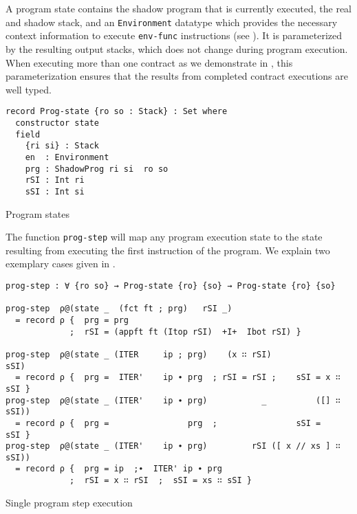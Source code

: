 A program state contains the shadow program that is currently executed,
the real and shadow stack, and an \verb/Environment/ datatype which provides the necessary
context information to execute \verb/env-func/ instructions (see ).
It is parameterized by the resulting output stacks, which does not change during program execution.
When executing more than one contract as we demonstrate in ,
this parameterization ensures that the results from completed contract executions are well typed.

\begin{listing}[!ht]
\begin{verbatim}
record Prog-state {ro so : Stack} : Set where
  constructor state
  field
    {ri si} : Stack
    en  : Environment
    prg : ShadowProg ri si  ro so
    rSI : Int ri
    sSI : Int si
\end{verbatim}
\caption{Program states}
\label{Prog-state}
\end{listing}

The function \verb/prog-step/ will map any program execution state to the state
resulting from executing the first instruction of the program.
We explain two exemplary cases given in .

\begin{listing}[!ht]
\begin{verbatim}
prog-step : ∀ {ro so} → Prog-state {ro} {so} → Prog-state {ro} {so}

prog-step  ρ@(state _  (fct ft ; prg)   rSI _)
  = record ρ {  prg = prg
             ;  rSI = (appft ft (Itop rSI)  +I+  Ibot rSI) }

prog-step  ρ@(state _ (ITER     ip ; prg)    (x ∷ rSI)               sSI)
  = record ρ {  prg =  ITER'    ip ∙ prg  ; rSI = rSI ;    sSI = x ∷ sSI }
prog-step  ρ@(state _ (ITER'    ip ∙ prg)           _          ([] ∷ sSI))
  = record ρ {  prg =                prg  ;                sSI =     sSI }
prog-step  ρ@(state _ (ITER'    ip ∙ prg)         rSI ([ x // xs ] ∷ sSI))
  = record ρ {  prg = ip  ;∙  ITER' ip ∙ prg
             ;  rSI = x ∷ rSI  ;  sSI = xs ∷ sSI }
\end{verbatim}
\caption{Single program step execution}
\label{prog-step}
\end{listing}

